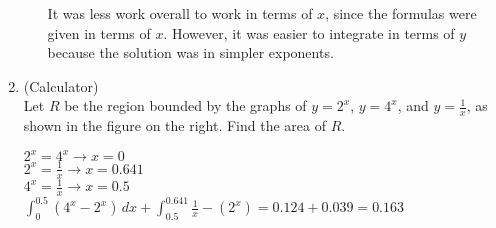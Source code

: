 \documentclass[10pt,letterpaper]{report}
\begin{document}
\begin{enumerate}
\begin{enumerate}
        It was less work overall to work in terms of $x$, since the formulas were given in terms of $x$. However, it was easier to integrate in terms of $y$ because the solution was in simpler exponents. \\
    \end{enumerate}
    
  \item{(Calculator) \\
        Let $R$ be the region bounded by the graphs of $y=2^{x}$, $y=4^{x}$, and $y=\frac{1}{x}$, as shown in the figure on the right. Find the area of $R$. \\}
        
          $2^{x}=4^{x}\rightarrow x=0$ \\
          
          $2^{x}=\frac{1}{x}\rightarrow x=0.641$ \\
          
          $4^{x}=\frac{1}{x}\rightarrow x=0.5$ \\
          
          $\int_{0}^{0.5}{\left(4^{x}-2^{x}\right)}\,dx+\int_{0.5}^{0.641}{\frac{1}{x}-\left(2^{x}\right)}=
          0.124+0.039=0.163$
        
\end{enumerate}
\end{document}
